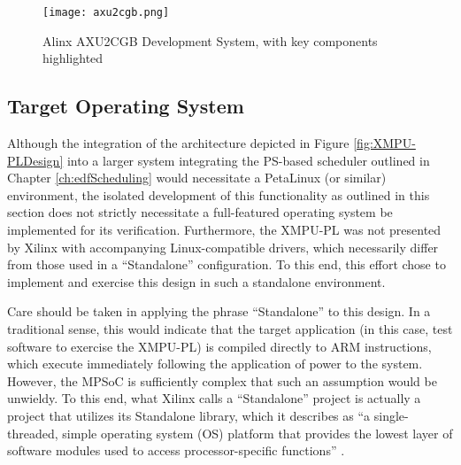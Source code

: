 \begin{figure}
    \centering
    \texttt{[image: axu2cgb.png]}
    \caption[AXU2CGB Development System]{Alinx AXU2CGB Development System, with key components highlighted \cite{noauthor_axu2cgb_nodate}}
    \label{fig:AXU2CGB}
\end{figure}

\subsection{Target Operating System}\label{subsec:DMAEnvironmentOS}
Although the integration of the architecture depicted in Figure \ref{fig:XMPU-PLDesign} into a larger system integrating the PS-based scheduler outlined in Chapter \ref{ch:edfScheduling} would necessitate a PetaLinux (or similar) environment, the isolated development of this functionality as outlined in this section does not strictly necessitate a full-featured operating system be implemented for its verification. Furthermore, the XMPU-PL was not presented by Xilinx with accompanying Linux-compatible drivers, which necessarily differ from those used in a ``Standalone'' configuration. To this end, this effort chose to implement and exercise this design in such a standalone environment. 

Care should be taken in applying the phrase ``Standalone'' to this design. In a traditional sense, this would indicate that the target application (in this case, test software to exercise the XMPU-PL) is compiled directly to ARM instructions, which execute immediately following the application of power to the system. However, the MPSoC is sufficiently complex that such an assumption would be unwieldy. To this end, what Xilinx calls a ``Standalone'' project is actually a project that utilizes its Standalone library, which it describes as ``a single-threaded, simple operating system (OS) platform that provides the lowest layer of software modules used to access processor-specific functions'' \cite{noauthor_os_2020}.

